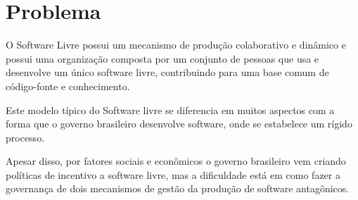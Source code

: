 \section{Problema}

O Software Livre possui um mecanismo de produção colaborativo e dinâmico 
e possui uma organização composta por um conjunto de pessoas que usa e desenvolve 
um único software livre, contribuindo para uma base comum de código-fonte e 
conhecimento.\cite{reis2003caracterizacc}

Este modelo típico do Software livre se diferencia em muitos aspectos com a forma
que o governo brasileiro desenvolve software, onde se estabelece um rígido processo.

Apesar disso, por fatores sociais e econômicos o governo brasileiro vem
criando políticas de incentivo a software livre, mas a dificuldade está em como
fazer a governança de dois mecanismos de gestão da produção de software antagônicos. 	




